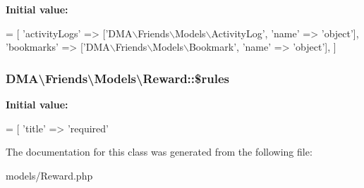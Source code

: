{\bfseries Initial value\+:}
\begin{DoxyCode}
= [ 
        \textcolor{stringliteral}{'activityLogs'}  => [\textcolor{stringliteral}{'DMA\(\backslash\)Friends\(\backslash\)Models\(\backslash\)ActivityLog'}, \textcolor{stringliteral}{'name'} => \textcolor{stringliteral}{'object'}],
        \textcolor{stringliteral}{'bookmarks'}     => [\textcolor{stringliteral}{'DMA\(\backslash\)Friends\(\backslash\)Models\(\backslash\)Bookmark'}, \textcolor{stringliteral}{'name'} => \textcolor{stringliteral}{'object'}],
    ]
\end{DoxyCode}
\hypertarget{classDMA_1_1Friends_1_1Models_1_1Reward_ab0f53a612317c68e59e32e0c4a4a2590}{
\subsubsection[{\$rules}]{\setlength{\rightskip}{0pt plus 5cm}D\+M\+A\textbackslash{}\+Friends\textbackslash{}\+Models\textbackslash{}\+Reward\+::\$rules}}\label{classDMA_1_1Friends_1_1Models_1_1Reward_ab0f53a612317c68e59e32e0c4a4a2590}
{\bfseries Initial value\+:}
\begin{DoxyCode}
= [ 
        \textcolor{stringliteral}{'title'} => \textcolor{stringliteral}{'required'}
\end{DoxyCode}


The documentation for this class was generated from the following file\+:\begin{DoxyCompactItemize}
\item 
models/Reward.\+php\end{DoxyCompactItemize}

